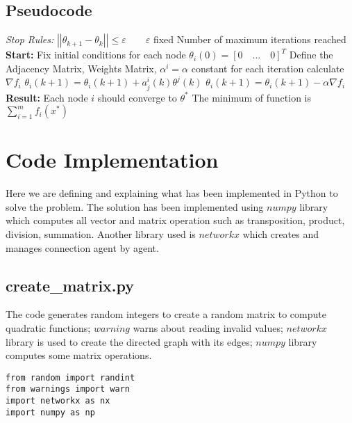 \documentclass[a4paper,11pt,oneside]{book}
\begin{document}
\subsection {Pseudocode} \label{Subsec1.1.3}
\begin{algorithm}
\caption{}
\begin{algorithmic} [1]
\State \textit{Stop Rules:}
\State $\left|\left|\theta_{k+1} - \theta_k\right|\right|  \leq \varepsilon \qquad \varepsilon$ fixed
\State Number of maximum iterations reached
\State \textbf{Start:}
\State Fix initial conditions for each node $\theta_i(0) = [0 \quad ... \quad 0]^T$
\State Define the Adjacency Matrix, Weights Matrix, $\alpha^i = \alpha$ constant for each iteration
	\State calculate $\nabla f_i$
		\State $\theta_i(k+1) = \theta_i(k+1) + a^i_j(k) \theta^j(k)$
	\EndFor
	\State $\theta_i(k+1) = \theta_i(k+1) - \alpha \nabla f_i$
\EndWhile
\State \textbf{Result:}
\State Each node $i$ should converge to $\theta^*$
\State The minimum of function is $\sum \limits_{i=1}^{m}f_i(x^*)$
\end{algorithmic}
\end{algorithm}


\section {Code Implementation} \label{Sec1.2}

Here we are defining and explaining what has been implemented in Python to solve the problem. The solution has been implemented using 
$numpy$ library which computes all vector and matrix operation such as transposition, product, division, summation. Another library used is
$networkx$ which creates and manages connection agent by agent.\\

\subsection {create\_matrix.py}

The code generates random integers to create a random matrix to
compute quadratic functions; $warning$ warns about reading invalid values; $networkx$ library is used to create the directed graph
with its edges; $numpy$ library computes some matrix operations.
\begin{lstlisting}
from random import randint
from warnings import warn
import networkx as nx
import numpy as np
\end{lstlisting}
\end{document}
